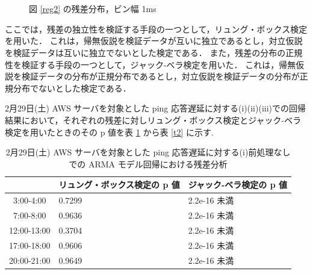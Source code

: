 \documentclass[a4j]{jarticle}
\begin{document}
\begin{figure}[H]
\begin{center}
~
~
\\
~
\caption{図 \ref{reg2} の残差分布，ビン幅 1ms}
\label{res2}
\end{center}
\end{figure}

ここでは，残差の独立性を検証する手段の一つとして，リュング・ボックス検定を用いた．
これは，帰無仮説を検証データが互いに独立であるとし，対立仮説を検証データは互いに独立でないとした検定である．
また，残差の分布の正規性を検証する手段の一つとして，ジャック-ベラ検定を用いた．
これは，帰無仮説を検証データの分布が正規分布であるとし，対立仮説を検証データの分布が正規分布でないとした検定である．

2月29日(土) AWS サーバを対象とした ping 応答遅延に対する(i)(ii)(iii)での回帰結果において，それぞれの残差に対しリュング・ボックス検定とジャック-ベラ検定を用いたときのその p 値を表 \ref{t1} から表 \ref{t2} に示す.
\begin{table}[H]
\begin{center}
\caption{2月29日(土) AWS サーバを対象とした ping 応答遅延に対する(i)前処理なしでの ARMA モデル回帰における残差分析}
\label{t1}
\begin{tabular}{|c|l|l|}
\hline
 &リュング・ボックス検定の p 値&ジャック-ベラ検定の p 値\\
\hline
3:00-4:00&0.7299&2.2e-16 未満\\
\hline
7:00-8:00&0.9636&2.2e-16 未満\\
\hline
12:00-13:00&0.3704&2.2e-16 未満\\
\hline
17:00-18:00&0.9606&2.2e-16 未満\\
\hline
20:00-21:00&0.9649&2.2e-16 未満\\
\hline
\end{tabular}
\end{center}
\end{table}
\end{document}
